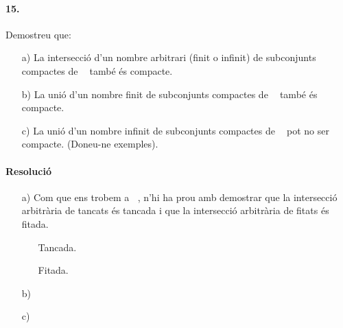 \documentclass[11pt]{article}
\DeclareMathOperator{\Rn}{\mathbb{R}^n}
\begin{document}
\paragraph{15.} Demostreu que:
\begin{itemize}
	\item[a)] La intersecció d'un nombre arbitrari (finit o infinit) de subconjunts compactes de $\Rn$ també és compacte.
	\item[b)] La unió d'un nombre finit de subconjunts compactes de $\Rn$ també és compacte.
	\item[c)] La unió d'un nombre infinit de subconjunts compactes de $\Rn$ pot no ser compacte. (Doneu-ne exemples).
\end{itemize}
\paragraph{Resolució}
\begin{itemize}
	\item[a)] Com que ens trobem a $\Rn$, n'hi ha prou amb demostrar que la intersecció arbitrària de tancats és tancada i que la intersecció arbitrària de fitats és fitada.
	\begin{itemize}
		\item[Tancada.]
		\item[Fitada.]
	\end{itemize}
	\item[b)]
	\item[c)]
\end{itemize}
\end{document}
